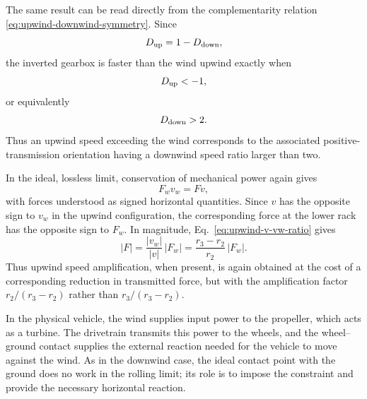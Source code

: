 \documentclass[a4paper]{article}
\begin{document}
The same result can be read directly from the complementarity relation
\eqref{eq:upwind-downwind-symmetry}.  Since
\[
D_{\rm up}=1-D_{\rm down},
\]
the inverted gearbox is faster than the wind upwind exactly when
\[
D_{\rm up}<-1,
\]
or equivalently
\[
D_{\rm down}>2.
\]
Thus an upwind speed exceeding the wind corresponds to the associated
positive-transmission orientation having a downwind speed ratio larger than
two.

In the ideal, lossless limit, conservation of mechanical power again gives
\[
F_w v_w = F v ,
\]
with forces understood as signed horizontal quantities.  Since \(v\) has the
opposite sign to \(v_w\) in the upwind configuration, the corresponding force
at the lower rack has the opposite sign to \(F_w\).  In magnitude,
Eq.~\eqref{eq:upwind-v-vw-ratio} gives
\begin{equation}
|F|
=
\frac{|v_w|}{|v|}\,|F_w|
=
\frac{r_3-r_2}{r_2}\,|F_w|.
\label{eq:upwind-force-ratio}
\end{equation}
Thus upwind speed amplification, when present, is again obtained at the cost of
a corresponding reduction in transmitted force, but with the amplification
factor \(r_2/(r_3-r_2)\) rather than \(r_3/(r_3-r_2)\).

In the physical vehicle, the wind supplies input power to the propeller, which
acts as a turbine.  The drivetrain transmits this power to the wheels, and the
wheel--ground contact supplies the external reaction needed for the vehicle to
move against the wind.  As in the downwind case, the ideal contact point with
the ground does no work in the rolling limit; its role is to impose the
constraint and provide the necessary horizontal reaction.
\end{document}
